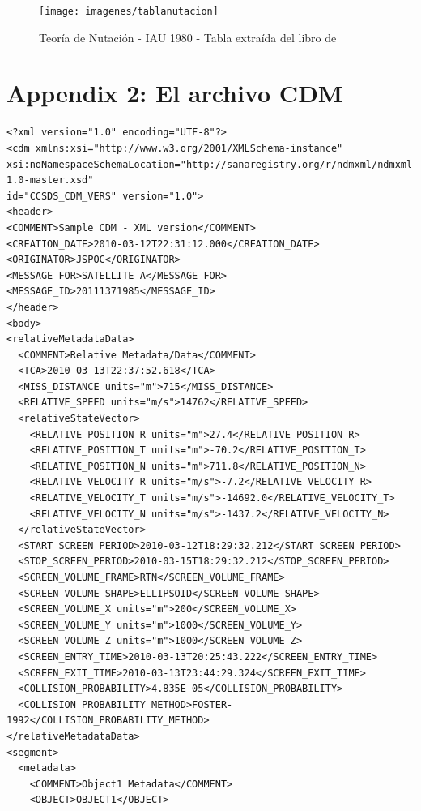 \begin{figure}[!h]
  \centering
  \texttt{[image: imagenes/tablanutacion]}
  \caption{Teor\'ia de Nutaci\'on - \ac{IAU} 1980 - Tabla extra\'ida del libro de \citep{montenbruck2012satellite}}
  \label{fig:tablaseidelman}
\end{figure}

\newpage
\section{Appendix 2: El archivo CDM}
\label{App2}

\lstset{language=XML,basicstyle=\small}
\begin{lstlisting}
<?xml version="1.0" encoding="UTF-8"?>
<cdm xmlns:xsi="http://www.w3.org/2001/XMLSchema-instance"
xsi:noNamespaceSchemaLocation="http://sanaregistry.org/r/ndmxml/ndmxml-1.0-master.xsd"
id="CCSDS_CDM_VERS" version="1.0">
<header>
<COMMENT>Sample CDM - XML version</COMMENT>
<CREATION_DATE>2010-03-12T22:31:12.000</CREATION_DATE>
<ORIGINATOR>JSPOC</ORIGINATOR>
<MESSAGE_FOR>SATELLITE A</MESSAGE_FOR>
<MESSAGE_ID>20111371985</MESSAGE_ID>
</header>
<body>
<relativeMetadataData>
  <COMMENT>Relative Metadata/Data</COMMENT>
  <TCA>2010-03-13T22:37:52.618</TCA>
  <MISS_DISTANCE units="m">715</MISS_DISTANCE>
  <RELATIVE_SPEED units="m/s">14762</RELATIVE_SPEED>
  <relativeStateVector>
    <RELATIVE_POSITION_R units="m">27.4</RELATIVE_POSITION_R>
    <RELATIVE_POSITION_T units="m">-70.2</RELATIVE_POSITION_T>
    <RELATIVE_POSITION_N units="m">711.8</RELATIVE_POSITION_N>
    <RELATIVE_VELOCITY_R units="m/s">-7.2</RELATIVE_VELOCITY_R>
    <RELATIVE_VELOCITY_T units="m/s">-14692.0</RELATIVE_VELOCITY_T>
    <RELATIVE_VELOCITY_N units="m/s">-1437.2</RELATIVE_VELOCITY_N>
  </relativeStateVector>
  <START_SCREEN_PERIOD>2010-03-12T18:29:32.212</START_SCREEN_PERIOD>
  <STOP_SCREEN_PERIOD>2010-03-15T18:29:32.212</STOP_SCREEN_PERIOD>
  <SCREEN_VOLUME_FRAME>RTN</SCREEN_VOLUME_FRAME>
  <SCREEN_VOLUME_SHAPE>ELLIPSOID</SCREEN_VOLUME_SHAPE>
  <SCREEN_VOLUME_X units="m">200</SCREEN_VOLUME_X>
  <SCREEN_VOLUME_Y units="m">1000</SCREEN_VOLUME_Y>
  <SCREEN_VOLUME_Z units="m">1000</SCREEN_VOLUME_Z>
  <SCREEN_ENTRY_TIME>2010-03-13T20:25:43.222</SCREEN_ENTRY_TIME>
  <SCREEN_EXIT_TIME>2010-03-13T23:44:29.324</SCREEN_EXIT_TIME>
  <COLLISION_PROBABILITY>4.835E-05</COLLISION_PROBABILITY>
  <COLLISION_PROBABILITY_METHOD>FOSTER-1992</COLLISION_PROBABILITY_METHOD>
</relativeMetadataData>
<segment>
  <metadata>
    <COMMENT>Object1 Metadata</COMMENT>
    <OBJECT>OBJECT1</OBJECT>

\end{lstlisting}
